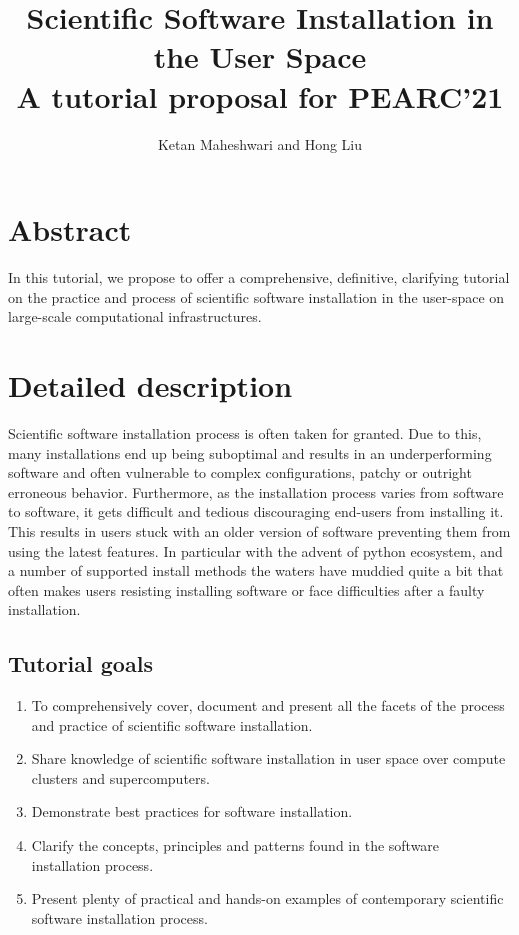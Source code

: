 \documentclass{report}
\title{Scientific Software Installation in the User Space\\
       \large A tutorial proposal for PEARC'21
			 }
\author{Ketan Maheshwari and Hong Liu}
\begin{document}
\maketitle
\section*{Abstract}
In this tutorial, we propose to offer a comprehensive, definitive, clarifying
tutorial on the practice and process of scientific software installation in the
user-space on large-scale computational infrastructures.

\section*{Detailed description}
Scientific software installation process is often taken for granted. Due to
this, many installations end up being suboptimal and results in an
underperforming software and often vulnerable to complex configurations, patchy
or outright erroneous behavior. Furthermore, as the installation process varies
from software to software, it gets difficult and tedious discouraging end-users
from installing it. This results in users stuck with an older version of
software preventing them from using the latest features.  In particular with
the advent of python ecosystem, and a number of supported install methods the
waters have muddied quite a bit that often makes users resisting installing
software or face difficulties after a faulty installation.

\subsection*{Tutorial goals}
\begin{enumerate}
\item To comprehensively cover, document and present all the facets of the process and practice of scientific software installation.
\item Share knowledge of scientific software installation in user space over compute clusters and supercomputers.
\item Demonstrate best practices for software installation.
\item Clarify the concepts, principles and patterns found in the software installation process.
\item Present plenty of practical and hands-on examples of contemporary scientific software installation process.
\end{enumerate}
\end{document}
